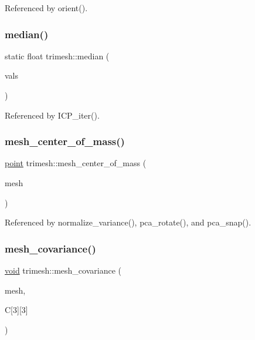 Referenced by orient().

\mbox{\label{namespacetrimesh_ae351c79429a7707be3fe35aee5e941a5}} 
\subsubsection{\texorpdfstring{median()}{median()}}
{\footnotesize\ttfamily static float trimesh\+::median (\begin{DoxyParamCaption}\item[{vector$<$ float $>$}]{vals }\end{DoxyParamCaption})\hspace{0.3cm}{\ttfamily [static]}}



Referenced by I\+C\+P\+\_\+iter().

\mbox{\label{namespacetrimesh_aba568e2df505cabcca614749e6569e40}} 
\subsubsection{\texorpdfstring{mesh\+\_\+center\+\_\+of\+\_\+mass()}{mesh\_center\_of\_mass()}}
{\footnotesize\ttfamily \hyperlink{namespacetrimesh_a325b99fd6454b22fa4c4bc3223271b2c}{point} trimesh\+::mesh\+\_\+center\+\_\+of\+\_\+mass (\begin{DoxyParamCaption}\item[{\hyperlink{classtrimesh_1_1TriMesh}{Tri\+Mesh} $\ast$}]{mesh }\end{DoxyParamCaption})}



Referenced by normalize\+\_\+variance(), pca\+\_\+rotate(), and pca\+\_\+snap().

\mbox{\label{namespacetrimesh_ae859cdffd0660c404766403a241da53d}} 
\subsubsection{\texorpdfstring{mesh\+\_\+covariance()}{mesh\_covariance()}}
{\footnotesize\ttfamily \hyperlink{namespacetrimesh_a784ddfd979e1c579bda795a8edfc3f43}{void} trimesh\+::mesh\+\_\+covariance (\begin{DoxyParamCaption}\item[{\hyperlink{classtrimesh_1_1TriMesh}{Tri\+Mesh} $\ast$}]{mesh,  }\item[{float(\&)}]{C\mbox{[}3\mbox{]}\mbox{[}3\mbox{]} }\end{DoxyParamCaption})}



